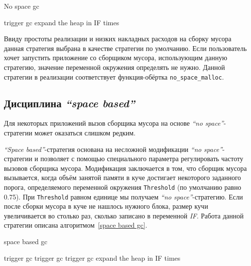 \documentclass[14pt]{extarticle}
\begin{document}
\begin{algorithm}[hbt]
\caption{No space gc}
\label{algo-no-space}
\begin{algorithmic}[3]
        \State trigger gc
            \State expand the heap in IF times
        \EndIf
\EndIf
\end{algorithmic}
\end{algorithm}

Ввиду простоты реализации и низких накладных расходов на сборку мусора
данная стратегия выбрана в качестве стратегии по умолчанию.
Если пользователь хочет запустить приложение со сборщиком мусора,
использующим данную стратегию, значение переменной окружения 
определять не нужно. Данной стратегии в реализации соответствует 
функция-обёртка \texttt{no\_space\_malloc}.



\subsection{Дисциплина \textit{``space based''}}
Для некоторых приложений вызов сборщика мусора на основе \textit{``no space''}-стратегии
может оказаться слишком редким. 

\textit{``Space based''}-стратегия основана на несложной модификации 
\textit{``no space''}-стратегии и позволяет с помощью специального параметра 
регулировать частоту вызовов сборщика мусора.
Модификация заключается в том, что сборщик мусора вызывается, когда
объём занятой памяти в куче достигает некоторого 
заданного порога, определяемого переменной окружения  \texttt{Threshold} (по умолчанию
равно 0.75). При \texttt{Threshold} равном единице мы получаем \textit{``no space''}-стратегию.
Если после сборки мусора в куче не нашлось нужного блока, размер кучи
увеличивается во столько раз, сколько записано в переменной \textit{IF}.
Работа данной стратегии описана алгоритмом~\ref{space based gc}.

\begin{algorithm}[hbt]
\caption{space based gc}
\label{space based gc}
\begin{algorithmic}[4]

    \State trigger gc
\EndIf
{}
        \State trigger gc
\EndIf
{}
            \State trigger gc
\EndIf
{}
    \State expand the heap in IF times
\EndIf 
\end{algorithmic}
\end{algorithm}
\end{document}
